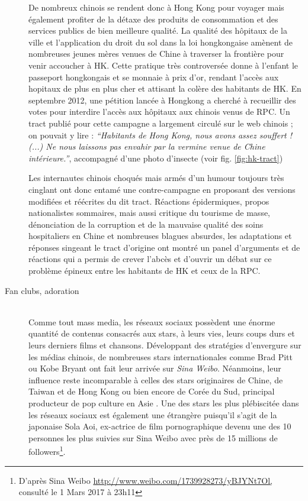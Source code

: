 \begin{description}
De nombreux chinois se rendent donc à Hong Kong pour voyager mais également profiter de la détaxe des produits de consommation et des services publics de bien meilleure qualité. La qualité des hôpitaux de la ville et l{\textquoteright}application du droit du sol dans la loi hongkongaise amènent de nombreuses jeunes mères venues de Chine à traverser la frontière pour venir accoucher à HK. Cette pratique très controversée donne à l{\textquoteright}enfant le passeport hongkongais et se monnaie à prix d{\textquoteright}or, rendant l{\textquoteright}accès aux hopitaux de plus en plus cher et attisant la colère des habitants de HK. En septembre 2012, une pétition lancée à Hongkong a cherché à recueillir des votes pour interdire l{\textquoteright}accès aux hôpitaux aux chinois venus de RPC. Un tract publié pour cette campagne a largement circulé sur le web chinois ; on pouvait y lire :\textit{ {\textquotedblleft}Habitants de Hong Kong, nous avons assez souffert ! (...) Ne nous laissons pas envahir par la vermine venue de Chine intérieure.{\textquotedblright}}, accompagné d'une photo d'insecte (voir fig. \ref{fig:hk-tract})

Les internautes chinois choqués mais armés d{\textquoteright}un humour toujours très cinglant ont donc entamé une contre-campagne en proposant des versions modifiées et réécrites du dit tract. Réactions épidermiques, propos nationalistes sommaires, mais aussi critique du tourisme de masse, dénonciation de la corruption et de la mauvaise qualité des soins hospitaliers en Chine et nombreuses blagues absurdes, les adaptations et réponses singeant le tract d{\textquoteright}origine ont montré un panel d{\textquoteright}arguments et de réactions qui a permis de crever l{\textquoteright}abcès et d{\textquoteright}ouvrir un débat sur ce problème épineux entre les habitants de HK et ceux de la RPC.  


\item[Fan clubs, adoration]
\hfill \\
Comme tout mass media, les réseaux sociaux possèdent une énorme quantité de contenus consacrés aux stars, à leurs vies, leurs coups durs et leurs derniers films et chansons. Développant des stratégies d{\textquoteright}envergure sur les médias chinois, de nombreuses stars internationales comme Brad Pitt ou Kobe Bryant ont fait leur arrivée sur \textit{Sina Weibo}. Néanmoins, leur influence reste incomparable à celles des stars originaires de Chine, de Taiwan et de Hong Kong ou bien encore de Corée du Sud, principal producteur de pop culture en Asie \citep{Martel2010}. Une des stars les plus plébiscitée dans les réseaux sociaux est également une étrangère puisqu{\textquoteright}il s{\textquoteright}agit de la japonaise Sola Aoi, ex-actrice de film pornographique devenu une des 10 personnes les plus suivies sur Sina Weibo avec près de 15 millions de followers\footnote{ D{\textquoteright}après Sina Weibo \url{http://www.weibo.com/1739928273/yBJYNt7Ol,} consulté le 1 Mars 2017 à 23h11}. 


\end{description}
